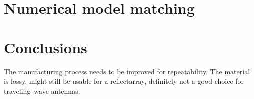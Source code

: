 \documentclass[11pt,a4paper]{article}
\begin{document}
    \section{Numerical model matching}
    \label{sec:numerical-model-matching}


    \section{Conclusions}
    \label{sec:conclusion}
    The manufacturing process needs to be improved for repeatability.
    The material is lossy, might still be usable for a reflectarray, definitely not a good choice for traveling--wave antennas.

    \clearpage
    
    
\end{document}
